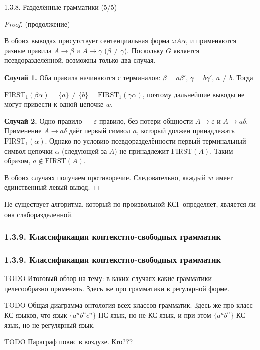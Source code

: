 \documentclass[mathserif,12pt,aspectratio=169]{beamer}
\def\TODO#1{{\color{gray} TODO {#1}}}
\begin{document}
\begin{frame}{1.3.8. Разделённые грамматики (5/5)}
\begin{proof} (продолжение)

В обоих выводах присутствует сентенциальная форма $  \omega A\alpha  $, и применяются разные правила $  A\to\beta  $ и $  A\to\gamma  $ ($  \beta\neq\gamma $). Поскольку $G$ является псевдоразделённой, возможны только два случая.

\textbf{Случай 1.} Оба правила начинаются с терминалов: $  \beta=a\beta'  $, $  \gamma=b\gamma'  $, $  a\neq b  $. Тогда 

\(\mathrm{FIRST}_1(\beta\alpha)=\{a\} \neq \{b\}=\mathrm{FIRST}_1(\gamma\alpha)  \), поэтому дальнейшие выводы не могут привести к одной цепочке $ w $.

\textbf{Случай 2.} Одно правило — $  \varepsilon  $-правило, без потери общности $ A\to\varepsilon $ и $ A\to a\delta $.
Применение $ A\to a\delta $ даёт первый символ $  a  $, который должен принадлежать $  \mathrm{FIRST}_1(\alpha) $.
Однако по условию псевдоразделённости первый терминальный символ цепочки $  \alpha  $ (следующей за $ A $) не принадлежит $  \mathrm{FIRST}(A) $. Таким образом, $ a\notin\mathrm{FIRST}(A) $.

В обоих случаях получаем противоречие. Следовательно, каждый $ w $ имеет единственный левый вывод.
\end{proof}

\smallskip

\begin{remark}
    Не существует алгоритма, который по произвольной КСГ определяет, является ли она слаборазделенной.
\end{remark}

\end{frame}


\subsubsection{1.3.9. Классификация контекстно-свободных грамматик}\label{1.3.9.}
\begin{frame}
\frametitle{1.3.9. Классификация контекстно-свободных грамматик}
\TODO{Итоговый обзор на тему: в каких случаях какие грамматики целесообразно применять. 
Здесь же про грамматики в регулярной форме.}

\TODO{Общая диаграмма онтология всех классов грамматик. 
Здесь же про класс КС-языков, что 
язык $\{a^n b^n c^n\}$ НС-язык, но не КС-язык,
и при этом $\{a^n b^n\}$ КС-язык, но 
не регулярный язык.}

\bigskip
\TODO{\color{blue} Параграф повис в воздухе. Кто???}
\end{frame}
\end{document}
